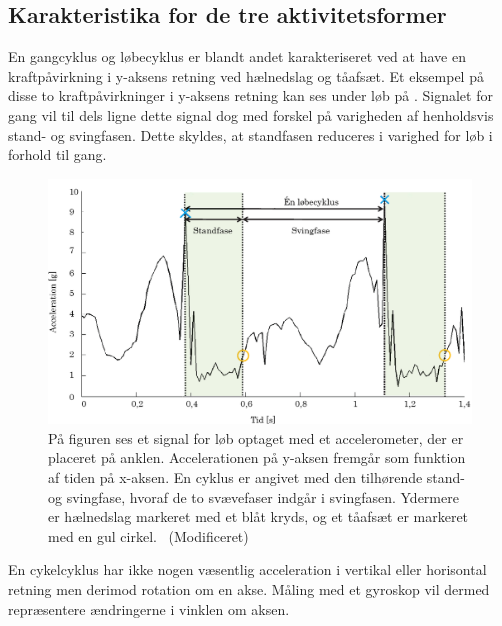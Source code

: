 \subsection{Karakteristika for de tre aktivitetsformer}
En gangcyklus og løbecyklus er blandt andet karakteriseret ved at have en kraftpåvirkning i y-aksens retning ved hælnedslag og tåafsæt. Et eksempel på disse to kraftpåvirkninger i y-aksens retning kan ses under løb på . Signalet for gang vil til dels ligne dette signal dog med forskel på varigheden af henholdsvis stand- og svingfasen. Dette skyldes, at standfasen reduceres i varighed for løb i forhold til gang.
\begin{figure}[H]
	\centering
	\includegraphics[scale=0.45]{figures/bProblemloesning/loeb_skolebog.png}
	\caption{På figuren ses et signal for løb optaget med et accelerometer, der er placeret på anklen. Accelerationen på y-aksen fremgår som funktion af tiden på x-aksen. En cyklus er angivet med den tilhørende stand- og svingfase, hvoraf de to svævefaser indgår i svingfasen. Ydermere er hælnedslag markeret med et blåt kryds, og et tåafsæt er markeret med en gul cirkel.~\citep{Strohrmann2011} (Modificeret)}
	\label{fig:loeb_skolebog}
\end{figure}\vspace{-0.25cm}
En cykelcyklus har ikke nogen væsentlig acceleration i vertikal eller horisontal retning men derimod rotation om en akse. Måling med et gyroskop vil dermed repræsentere ændringerne i vinklen om aksen.~\citep{Cockcroft2011,Marin-PerianuMarin-Perianu2013} 
